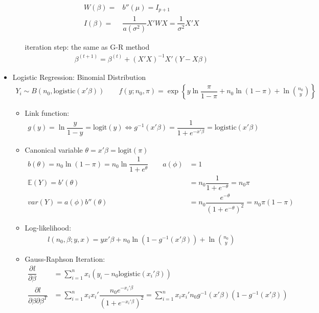 \begin{itemize}[topsep=2pt,itemsep=0pt]
\begin{itemize}[topsep=2pt,itemsep=0pt]
        \begin{align}
            W(\beta  )=&b''(\mu )=I_{p+1}\\
            I(\beta  )=&\dfrac{1}{a(\sigma ^2)}X'WX=\dfrac{1}{\sigma ^2}X'X
        \end{align}
        
        iteration step: the same as G-R method
        \begin{align}
            \beta ^{(t+1)}= \beta ^{(t)}+(X'X)^{-1}X'(Y-X\beta )
        \end{align}
        
    \end{itemize}
    
    \item Logistic Regression: Binomial Distribution
    \begin{align}
        Y_i\sim B(n_0,\mathrm{logistic}(x'\beta ) )\qquad f(y;n_0,\pi )=\exp\left\{ y\ln\dfrac{\pi}{1-\pi}+n_0\ln(1-\pi)+\ln\binom{n_0}{y} \right\}  
    \end{align}
    
    \begin{itemize}[topsep=2pt,itemsep=0pt]
        \item Link function:
        \begin{align}
            g(y)=\ln\dfrac{y}{1-y}=\mathrm{logit}(y)\Leftrightarrow g^{-1}(x'\beta )=\dfrac{1}{1+e^{-x'\beta }}=\mathrm{logistic}(x'\beta )   
        \end{align}
        \item Canonical variable $ \theta =x'\beta = \mathrm{logit}(\pi)$
        \begin{align}
            b(\theta )=n_0\ln(1-\pi)=n_0\ln\dfrac{1}{1+e^\theta } \qquad a(\phi)&=1\\
            \mathbb{E}(Y)=b'(\theta)&=n_0\dfrac{1}{1+e^{-\theta }}=n_0\pi\\
            var(Y)=a(\phi )b''(\theta )&=n_0\dfrac{e^{-\theta }}{(1+e^{-\theta })^2}=n_0\pi(1-\pi)
        \end{align}
        
        \item Log-likelihood:
        \begin{align}
            l(n_0,\beta ;y,x)=yx'\beta  +n_0\ln(1-g^{-1}(x'\beta ))+\ln\binom{n_0}{y} 
        \end{align}
        \item Gauss-Raphson Iteration:
        \begin{align}
            \dfrac{\partial^{} l}{\partial \beta ^{}}&=\sum_{i=1}^n x_i\left( y_i-n_0\mathrm{logistic}(x_i'\beta )  \right)\\
            \dfrac{\partial l}{\partial \beta \partial \beta ^T}&=\sum_{i=1}^n x_ix_i'\dfrac{n_0e^{-x_i'\beta }}{(1+e^{-x_i'\beta })^2}=\sum_{i=1}^nx_ix_i'n_0g^{-1}(x'\beta )(1-g^{-1}(x'\beta ))
        \end{align}


\end{itemize}
\end{itemize}
